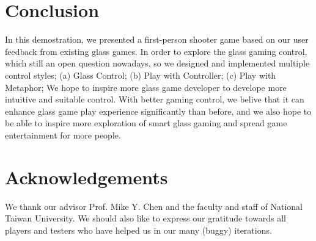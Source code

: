 \documentclass{sigchi}
\begin{document}
\section{Conclusion}
In this demostration, we presented a first-person shooter game based on our user feedback from existing glass games. In order to explore the glass gaming control, which still an open question nowadays, so we designed and implemented multiple control styles; (a) Glass Control; (b) Play with Controller; (c) Play with Metaphor; We hope to inspire more glass game developer to develope more intuitive and suitable control. With better gaming control, we belive that it can enhance glass game play experience significantly than before, and we also hope to be able to inspire more exploration of smart glass gaming and spread game entertainment for more people.


\section{Acknowledgements}
We thank our advisor Prof. Mike Y. Chen and the faculty and staff of National Taiwan University. We should also like to express our gratitude towards all players and testers who have helped us in our many (buggy) iterations.

\balance



\end{document}

